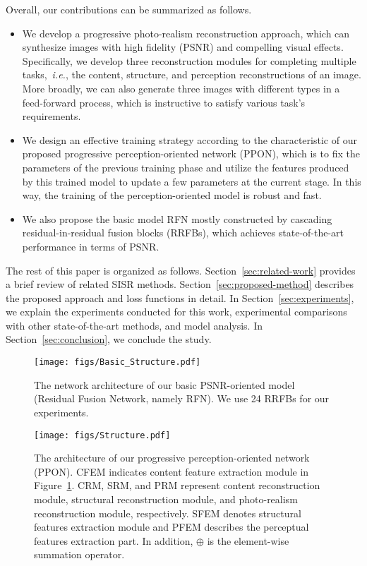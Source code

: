 \documentclass[preprint]{elsarticle}
\newcommand{\ie}{\textit{i.e.}}
\begin{document}
Overall, our contributions can be summarized as follows.
\begin{itemize}
	
	\item We develop a progressive photo-realism reconstruction approach, which can synthesize images with high fidelity (PSNR) and compelling visual effects. Specifically, we develop three reconstruction modules for completing multiple tasks,~\ie, the content, structure, and perception reconstructions of an image. More broadly, we can also generate three images with different types in a feed-forward process, which is instructive to satisfy various task's requirements.
	
	\item We design an effective training strategy according to the characteristic of our proposed progressive perception-oriented network (PPON), which is to fix the parameters of the previous training phase and utilize the features produced by this trained model to update a few parameters at the current stage. In this way, the training of the perception-oriented model is robust and fast.
	
	\item We also propose the basic model RFN mostly constructed by cascading residual-in-residual fusion blocks (RRFBs), which achieves state-of-the-art performance in terms of PSNR.
	
\end{itemize}
The rest of this paper is organized as follows. Section~\ref{sec:related-work} provides a brief review of related SISR methods. Section~\ref{sec:proposed-method} describes the proposed approach and loss functions in detail. In Section~\ref{sec:experiments}, we explain the experiments conducted for this work, experimental comparisons with other state-of-the-art methods, and model analysis. In Section~\ref{sec:conclusion}, we conclude the study.

\begin{figure}[htpb]
	\begin{center}
		\texttt{[image: figs/Basic\_Structure.pdf]}
	\end{center}
	\caption{The network architecture of our basic PSNR-oriented model (Residual Fusion Network, namely RFN). We use 24 RRFBs for our experiments.}
	\label{fig:basic_structure}
\end{figure}

\begin{figure}[htpb]
	\begin{center}
		\texttt{[image: figs/Structure.pdf]}
	\end{center}
	\caption{The architecture of our progressive perception-oriented network (PPON). CFEM indicates content feature extraction module in Figure~\ref{fig:basic_structure}. CRM, SRM, and PRM represent content reconstruction module, structural reconstruction module, and photo-realism reconstruction module, respectively. SFEM denotes structural features extraction module and PFEM describes the perceptual features extraction part. In addition, $ \oplus $ is the element-wise summation operator.}
	\label{fig:architecture}
\end{figure}
\end{document}
